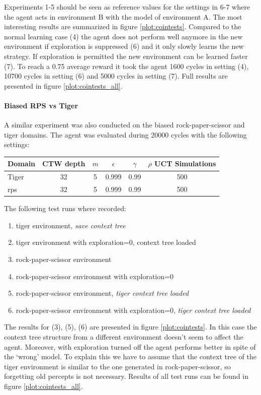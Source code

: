 \documentclass[paper=a4, fontsize=11pt]{scrartcl} %
\numberwithin{equation}{section} %
\numberwithin{figure}{section} %
\numberwithin{table}{section} %
\begin{document}
Experiments 1-5 should be seen as reference values for the settings in 6-7 where the agent acts in environment B with the model of environment A. The most interesting results are summarized in figure \ref{plot:cointests}.  Compared to the normal learning case (4) the agent does not perform well anymore in the new environment if exploration is suppressed (6) and it only slowly learns the new strategy. If exploration is permitted the new environment can be learned faster (7). To reach a 0.75 average reward it took the agent 1600 cycles in setting (4), 10700 cycles in setting (6) and 5000 cycles in setting (7). Full results are presented in figure \ref{plot:cointests_all}.

\paragraph{Biased RPS vs Tiger}
A similar experiment was also conducted on the biased rock-paper-scissor and tiger domains. The agent was evaluated during 20000 cycles with the following settings:

\bigskip

\begin{tabular}{|l|c|c|c|c|c|}
\hline
Domain & CTW depth & $m$ & $\epsilon$ &$\gamma $ & $\rho$ UCT Simulations\\\hline
Tiger & 32 & 5 & 0.999 & 0.99 & 500\\
rps & 32 & 5 & 0.999 & 0.99 & 500\\\hline
\end{tabular}

\bigskip

The following test runs where recorded:
\begin{enumerate}
 \setlength{\itemsep}{0cm}%
  \setlength{\parskip}{0cm}%
\item tiger environment,\emph{ save context tree}
\item tiger environment with exploration=0, context tree loaded
\item rock-paper-scissor environment
\item rock-paper-scissor environment with exploration=0
\item rock-paper-scissor environment, \emph{tiger context tree loaded} 
\item rock-paper-scissor environment with exploration=0, \emph{tiger context tree loaded} 
\end{enumerate}

The results for (3), (5), (6) are presented in figure \ref{plot:cointests}. In this case the context tree structure from a different environment doesn't seem to affect the agent. Moreover, with exploration turned off the agent performs better in spite of the `wrong' model. To explain this we have to assume that the context tree of the tiger environment is similar to the one generated in rock-paper-scissor, so forgetting old percepts is not necessary. Results of all test runs can be found in figure \ref{plot:cointests_all}.
\end{document}
